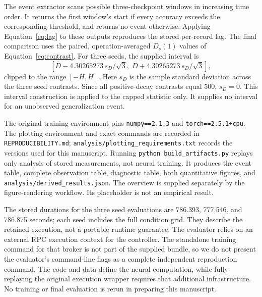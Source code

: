 \documentclass{article}
\begin{document}
The event extractor scans possible three-checkpoint windows in increasing time order. It returns the first window's start if every accuracy exceeds the corresponding threshold, and returns no event otherwise. Applying Equation~\ref{eq:lag} to these outputs reproduces the stored per-record lag. The final comparison uses the paired, operation-averaged $D_s(1)$ values of Equation~\ref{eq:contrast}. For three seeds, the supplied interval is
\begin{equation}
\left[\overline D-4.30265273\,s_D/\sqrt{3},\;
\overline D+4.30265273\,s_D/\sqrt{3}\right],
\end{equation}
clipped to the range $[-H,H]$. Here $s_D$ is the sample standard deviation across the three seed contrasts. Since all positive-decay contrasts equal 500, $s_D=0$. This interval construction is applied to the capped statistic only. It supplies no interval for an unobserved generalization event.

The original training environment pins \texttt{numpy==2.1.3} and \texttt{torch==2.5.1+cpu}. The plotting environment and exact commands are recorded in \texttt{REPRODUCIBILITY.md}; \texttt{analysis/plotting\_requirements.txt} records the versions used for this manuscript. Running \texttt{python build\_artifacts.py} replays only analysis of stored measurements, not neural training. It produces the event table, complete observation table, diagnostic table, both quantitative figures, and \texttt{analysis/derived\_results.json}. The overview is supplied separately by the figure-rendering workflow. Its placeholder is not an empirical result.

The stored durations for the three seed evaluations are 786.393, 777.546, and 786.875 seconds; each seed includes the full condition grid. They describe the retained execution, not a portable runtime guarantee. The evaluator relies on an external RPC execution context for the controller. The standalone training command for that broker is not part of the supplied bundle, so we do not present the evaluator's command-line flags as a complete independent reproduction command. The code and data define the neural computation, while fully replaying the original execution wrapper requires that additional infrastructure. No training or final evaluation is rerun in preparing this manuscript.
\end{document}
